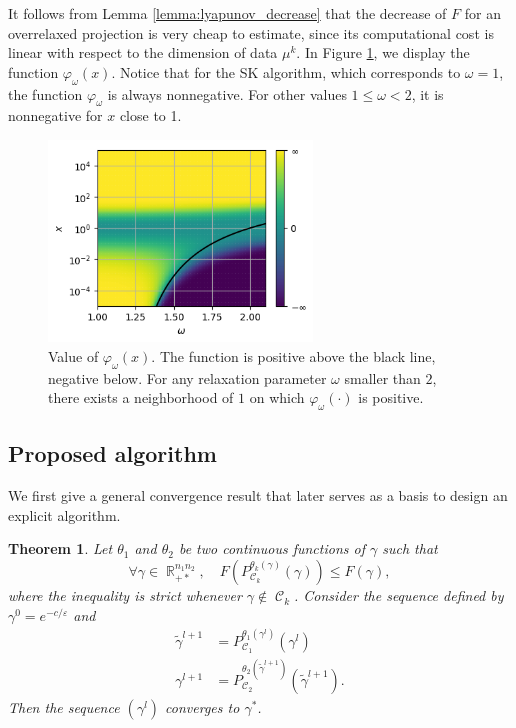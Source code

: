 \documentclass{article} %
\DeclareMathOperator{\IR}{\mathbb{R}}
\DeclareMathOperator{\Ccal}{\mathcal{C}}
\renewcommand{\epsilon}{\varepsilon}
\theoremstyle{plain}
\newtheorem{theorem}{Theorem}
\theoremstyle{definition}
\theoremstyle{remark}
\begin{document}

It follows from Lemma \ref{lemma:lyapunov_decrease} that the decrease of $F$ for an overrelaxed projection is very cheap to estimate, since its computational cost is linear with respect to the dimension of data $\mu^k$. In Figure \ref{phi_omega}, we display the function  $\varphi_\omega(x)$. Notice that for the SK algorithm, which corresponds to $\omega=1$, the function $\varphi_\omega$ is always nonnegative. For other values $1\le\omega<2$, it is nonnegative for $x$ close to 1.

\begin{figure}[ht!]
\begin{center}
\includegraphics[width=7cm]{images/cvgce_zone}
\caption{\label{phi_omega} Value of $\varphi_\omega(x)$. The function is positive above the black line, negative below. For any relaxation parameter $\omega$ smaller than $2$, there exists a neighborhood of $1$ on which $\varphi_\omega(\cdot)$ is positive.}
\end{center}
\end{figure}

\subsection{Proposed algorithm}
We first give a general convergence result that later serves as a basis to design an explicit algorithm.
\begin{theorem}\label{thm:algo}
Let $\theta_1$ and $\theta_2$ be two continuous functions of $\gamma$ such that
	\begin{equation}\label{eq:cond_theta_k}
	\forall \gamma \in \IR_{+*}^{n_1 n_2},\quad
	F(P_{\Ccal_k}^{\theta_k(\gamma)}(\gamma)) \le F(\gamma) ,
	\end{equation}
	where the inequality is strict whenever $\gamma \notin \Ccal_k$.
	Consider the sequence defined by $\gamma^0 = e^{-c/\epsilon}$ and
	\begin{align*}
	\tilde{\gamma}^{l+1} &= P_{\Ccal_1}^{\theta_1(\gamma^l)}(\gamma^l) \\
	\gamma^{l+1} &= P_{\Ccal_2}^{\theta_2(\tilde{\gamma}^{l+1})}(\tilde{\gamma}^{l+1}).
	\end{align*}
	Then the sequence $(\gamma^l)$ converges to $\gamma^*$.
\end{theorem}
\end{document}
